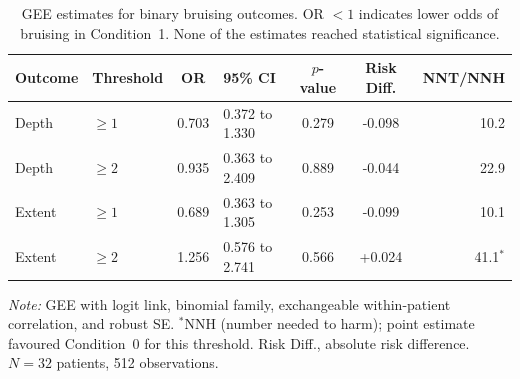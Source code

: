 \begin{table}[htbp]
\centering
\caption{GEE estimates for binary bruising outcomes. OR $< 1$ indicates lower odds of bruising in Condition~1. None of the estimates reached statistical significance.}
\label{tab:binary-gee}
\begin{tabular}{l l S[table-format=1.3] l S[table-format=1.3] S[table-format=-1.3] r}
\toprule
{Outcome} & {Threshold} & {OR} & {95\% CI} & {$p$-value} & {Risk Diff.} & {NNT/NNH} \\
\midrule
Depth  & $\geq 1$ & 0.703 & 0.372 to 1.330 & 0.279 & -0.098 & 10.2 \\
Depth  & $\geq 2$ & 0.935 & 0.363 to 2.409 & 0.889 & -0.044 & 22.9 \\
Extent & $\geq 1$ & 0.689 & 0.363 to 1.305 & 0.253 & -0.099 & 10.1 \\
Extent & $\geq 2$ & 1.256 & 0.576 to 2.741 & 0.566 & +0.024 & 41.1$^{*}$ \\
\bottomrule
\end{tabular}
\smallskip

\noindent\textit{Note:} GEE with logit link, binomial family, exchangeable within-patient correlation, and robust SE. $^{*}$NNH (number needed to harm); point estimate favoured Condition~0 for this threshold. Risk Diff., absolute risk difference. $N = 32$ patients, 512 observations.
\end{table}
